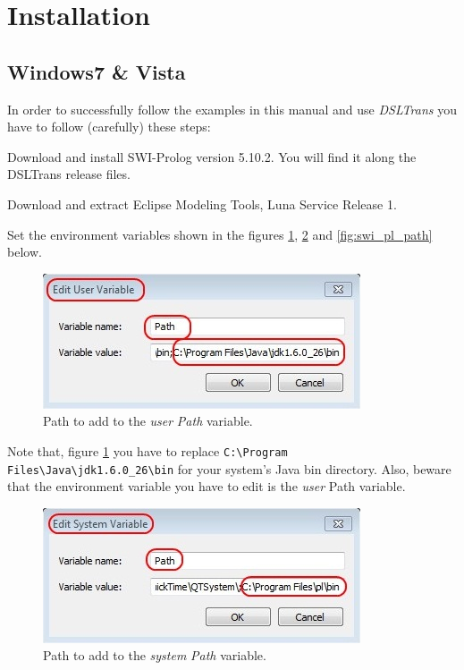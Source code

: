 ﻿\section{Installation}
\label{sec:installation}

\subsection{Windows7 \& Vista}

In order to successfully follow the examples in this manual and use
\emph{DSLTrans} you have to follow (carefully) these steps:

Download and install SWI-Prolog version 5.10.2. You will find it along the DSLTrans release files.

Download and extract Eclipse Modeling Tools, Luna Service Release 1.

Set the environment variables shown in the figures \ref{fig:path_user}, \ref{fig:path_system} and \ref{fig:swi_pl_path} below.

\begin{figure}[h]
\begin{center}
  \includegraphics[scale=0.9]{imgs/path_user.jpg}
  \caption{Path to add to the \emph{user} \emph{Path} variable.}
  \label{fig:path_user}
\end{center}
\end{figure}

Note that, figure \ref{fig:path_user} you have to replace \verb=C:\Program Files\Java\jdk1.6.0_26\bin=
for your system's Java bin directory. Also, beware that the environment
variable you have to edit is the \emph{user} Path variable.

\begin{figure}[h]
\begin{center}
  \includegraphics[scale=0.9]{imgs/path_system.jpg}
  \caption{Path to add to the \emph{system} \emph{Path} variable.}
  \label{fig:path_system}
\end{center}
\end{figure}

